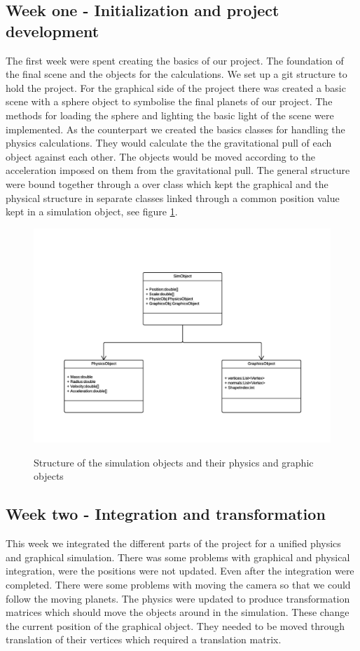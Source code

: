 \documentclass[a4paper,11pt]{article}
\begin{document}
\subsection{Week one - Initialization and project development}
The first week were spent creating the basics of our project. The foundation of the final scene and the objects for the calculations. 
We set up a git structure to hold the project.
For the graphical side of the project there was created a basic scene with a sphere object to symbolise the final planets of our project. The methods for loading the sphere and lighting the basic light of the scene were implemented.
As the counterpart we created the basics classes for handling the physics calculations. They would calculate the the gravitational pull of each object against each other. The objects would be moved according to the acceleration imposed on them from the gravitational pull. 
The general structure were bound together through a over class which kept the graphical and the physical structure in separate classes linked through a common position value kept in a simulation object, see figure \ref{GraphicsObjects}.
\begin{figure}[h]
\centering
\includegraphics[scale=0.7]{GraphicsProjectObjects.png}
\label{GraphicsObjects}
\caption{Structure of the simulation objects and their physics and graphic objects}
\end{figure}
\subsection{Week two - Integration and transformation}
This week we integrated the different parts of the project for a unified physics and graphical simulation. There was some problems with graphical and physical integration, were the positions were not updated. 
Even after the integration were completed. There were some problems with moving the camera so that we could follow the moving planets. 
The physics were updated to produce transformation matrices which should move the objects around in the simulation. These change the current position of the graphical object. They needed to be moved through translation of their vertices which required a translation matrix.
\end{document}
